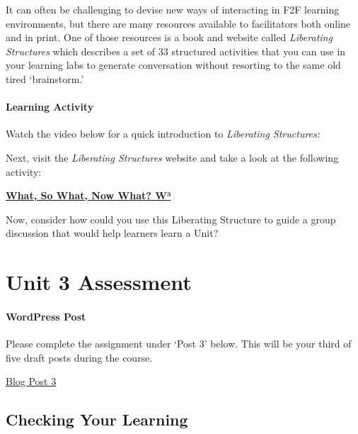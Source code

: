 \documentclass[
]{book}
\begin{document}
It can often be challenging to devise new ways of interacting in F2F learning environments, but there are many resources available to facilitators both online and in print. One of those resources is a book and website called \emph{Liberating Structures} which describes a set of 33 structured activities that you can use in your learning labs to generate conversation without resorting to the same old tired `brainstorm.'

\begin{reflect}
\hypertarget{learning-activity}{%
\paragraph{Learning Activity}\label{learning-activity}}

Watch the video below for a quick introduction to \emph{Liberating
Structures:}

Next, visit the \emph{Liberating Structures} website and take a look at
the following activity:

\href{http://www.liberatingstructures.com/9-what-so-what-now-what-w/}{\textbf{What,
So What, Now What? W³}}

Now, consider how could you use this Liberating Structure to guide a
group discussion that would help learners learn a Unit?
\end{reflect}

\hypertarget{unit-3-assessment}{%
\section*{Unit 3 Assessment}\label{unit-3-assessment}}

\begin{wp}
\hypertarget{wordpress-post}{%
\paragraph{WordPress Post}\label{wordpress-post}}

Please complete the assignment under `Post 3' below. This will be your
third of five draft posts during the course.

\href{https://ma-lead.github.io/ldrs663/assessments.html\#post-3}{Blog
Post 3}
\end{wp}

\hypertarget{checking-your-learning}{%
\subsection*{Checking Your Learning}\label{checking-your-learning}}
\end{document}

